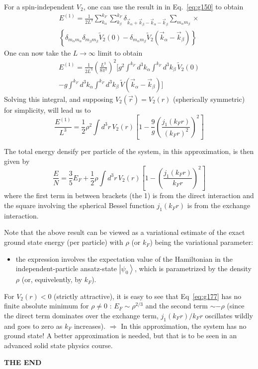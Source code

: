 \documentclass[12pt]{article}
\newcommand{\be}{\begin{equation}}
\newcommand{\ee}{\end{equation}}
\begin{document}
For a spin-independent $V_{2}$, one can use the result in
in Eq.~\eqref{eq:g150} to obtain
\be
\begin{gathered}
E^{(1)}=\frac{1}{2 L^{3}} \sum_{k_{\alpha}}^{k_{F}} \sum_{k_{\beta}}^{k_{F}} \delta_{\vec{k}_{\alpha}+\vec{k}_{\beta}-\vec{k}_{\alpha}-\vec{k}_{\beta}} \sum_{m_{\alpha} m_{\beta}}
\times\\
\left\{
 \delta_{m_{\alpha} m_{\alpha}} \delta_{m_{\beta} m_{\beta}} \widetilde{V}_{2}(0)
-\delta_{m_{\alpha} m_{\beta}} \widetilde{V}_{2}\left(\vec{k}_{\alpha}-\vec{k}_{\beta}\right)
\right\}
\end{gathered}
\ee
One can now take the $L \to \infty$ limit to obtain
\be
\begin{gathered}
E^{(1)}=\frac{1}{2 L^{3}}\left(\frac{L^{3}}{8 \pi^{3}}\right)^{2}\bigg[g^{2} \int^{k_{F}} d^{3} k_{\alpha} \int^{k_{F}} d^{3} k_{\beta} \,\widetilde{V}_{2}(0)\\
-g \int^{k_{F}} d^{3} k_{\alpha} \int^{k_{F}} d^{3} k_{\beta} \,\widetilde{V}\left(\vec{k}_{\alpha}-\vec{k}_{\beta}\right)\bigg]
\end{gathered}
\ee
Solving this integral, and supposing $V_2(\vec{r}) = V_2(r)$ (spherically symmetric) for simplicity, will lead us to
\setcounter{equation}{175}
\be
\boxed{
\frac{E^{(1)}}{L^{3}}=\frac{1}{2} \rho^{2} \int d^{3} r\, V_{2}(r)\left[1-\frac{9}{g}
\left(\frac{j_{1}\left(k_{F} r\right)}{\left(k_{F} r\right)^{2}}\right)^{2}\right]
}
\ee

The total energy densify per particle of the system, in
this approximation, is then given by
\be
\boxed{
\frac{E}{N}=\frac{3}{5} E_{F}+
\frac{1}{2} \rho \int d^{3} r \, V_{2}(r)
\left[1-\left(\frac{j_{1}\left(k_{F} r\right)}{k_{F} r}\right)^{2}\right]
}
\label{eq:g177}
\ee
where the first term  in between brackets (the 1) is from the direct interaction and the square involving the spherical Bessel function $j_1(k_F r)$ is from the exchange interaction.


Note that the above result can be viewed as a
variational estimate of the exact ground state energy
(per particle) with $\rho$ (or $k_{F}$) being the variational
parameter:
\begin{itemize}
\item the expression involves the expectation value
of the Hamiltonian in the independent-particle
ansatz-state $\left|\psi_{0}\right\rangle$, which is parametrized
by the density $\rho$ (or, equivelently, by $k_F$).
\end{itemize}

For $V_{2}(r)<0$ (strictly attractive), it is easy to
see that Eq~\eqref{eq:g177} has no finite absolute
minimum for $\rho \neq 0$ : $E_{F} \sim \rho^{2 / 3}$ and the second
term $\sim-\rho$ (since the direct term dominates over
the exchange term, $j_{1}(k_{F} r) / k_{F} r$ oscillates wildly and
goes to zero as $k_{F}$ increases).
$\Rightarrow$ In this approximation, the system has no ground state! A better approximation is needed, but that is to be seen in an advanced solid state physics course.

\medskip

\begin{center}
\textbf{THE END}
\end{center}
\end{document}
